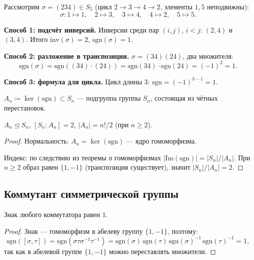 \begin{example}
    Рассмотрим $\sigma = (234) \in S_5$ (цикл $2\to3\to4\to2$, элементы $1,5$ неподвижны):
    \[
        \sigma\colon 1\mapsto 1,\quad 2\mapsto 3,\quad 3\mapsto 4,\quad 4\mapsto 2,\quad 5\mapsto 5.
    \]

    \textbf{Способ 1: подсчёт инверсий.}
    Инверсии среди пар $(i,j)$, $i < j$: $(2,4)$ и $(3,4)$. Итого $\mathrm{inv}(\sigma) = 2$, $\mathrm{sgn}(\sigma) = 1$.

    \textbf{Способ 2: разложение в транспозиции.}
    $\sigma = (34)(24)$, два множителя:
    \[
        \mathrm{sgn}(\sigma) = \mathrm{sgn}((34) \cdot (24)) = \mathrm{sgn}(34)\cdot\mathrm{sgn}(24) = (-1)^2 = 1.
    \]

    \textbf{Способ 3: формула для цикла.}
    Цикл длины $3$: $\mathrm{sgn} = (-1)^{3-1} = 1$.
\end{example}



\begin{definition}
    $A_n \coloneqq \ker(\mathrm{sgn}) \subset S_n$ --- подгруппа группы $S_n$, состоящая из чётных перестановок.
\end{definition}

\begin{stmt}
    $A_n \trianglelefteq S_n$, $[S_n : A_n] = 2$, $|A_n| = n!/2$ (при $n \geq 2$).
    \begin{proof}
        Нормальность: $A_n = \ker(\mathrm{sgn})$ --- ядро гомоморфизма.

        Индекс: по следствию из теоремы о гомоморфизмах $|\mathrm{Im}(\mathrm{sgn})| = |S_n|/|A_n|$.
        При $n \geq 2$ образ равен $\{1,-1\}$ (транспозиция существует), значит $|S_n|/|A_n| = 2$.
    \end{proof}
\end{stmt}


\subsection*{Коммутант симметрической группы}

\begin{lemma}
    Знак любого коммутатора равен $1$.

    \begin{proof}
        Знак --- гомоморфизм в абелеву группу $\{1,-1\}$, поэтому:
        \[
            \mathrm{sgn}([\sigma,\tau])
            = \mathrm{sgn}(\sigma\tau\sigma^{-1}\tau^{-1})
            = \mathrm{sgn}(\sigma)\,\mathrm{sgn}(\tau)\,\mathrm{sgn}(\sigma)^{-1}\,\mathrm{sgn}(\tau)^{-1}
            = 1,
        \]
        так как в абелевой группе $\{1,-1\}$ можно переставлять множители.
    \end{proof}
\end{lemma}

